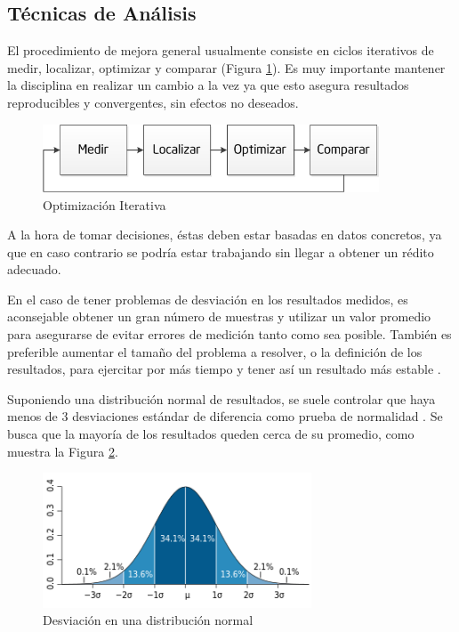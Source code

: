 \documentclass[a4paper]{report}
\begin{document}
\subsection{Técnicas de Análisis}

El procedimiento de mejora general usualmente consiste en ciclos iterativos de medir, localizar, optimizar y comparar (Figura \ref{fig:cycle}). 
Es muy importante mantener la disciplina en realizar un cambio a la vez ya que esto asegura resultados reproducibles y convergentes, sin efectos no deseados.

\begin{figure}[H]
\begin{center}
\includegraphics[width=10cm]{cycle.png}
\caption{Optimización Iterativa}
\label{fig:cycle}
\end{center}
\end{figure}

A la hora de tomar decisiones, éstas deben estar basadas en datos concretos, ya que en caso contrario se podría estar trabajando sin llegar a obtener un rédito adecuado.

\bigskip

En el caso de tener problemas de desviación en los resultados medidos, es aconsejable obtener un gran número de muestras y utilizar un valor promedio para asegurarse de evitar errores de
medición tanto como sea posible. También es preferible aumentar el tamaño del problema a resolver, o la definición de los resultados, para ejercitar por más tiempo y tener así un resultado más estable \cite{stddevbook}.

\bigskip

Suponiendo una distribución normal de resultados, se suele controlar que haya menos de 3 desviaciones estándar de diferencia como prueba de normalidad \cite{threesigmas}.
Se busca que la mayoría de los resultados queden cerca de su promedio, como muestra la Figura \ref{fig:deviation}.

\begin{figure}[H]
\centering
\includegraphics[width=8cm]{deviation.png}
\caption{Desviación en una distribución normal}
\label{fig:deviation}
\end{figure}
\end{document}
